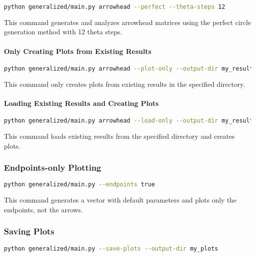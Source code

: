 \begin{lstlisting}[language=bash]
python generalized/main.py arrowhead --perfect --theta-steps 12
\end{lstlisting}

This command generates and analyzes arrowhead matrices using the perfect circle generation method with 12 theta steps.

\paragraph{Only Creating Plots from Existing Results}

\begin{lstlisting}[language=bash]
python generalized/main.py arrowhead --plot-only --output-dir my_results
\end{lstlisting}

This command only creates plots from existing results in the specified directory.

\paragraph{Loading Existing Results and Creating Plots}

\begin{lstlisting}[language=bash]
python generalized/main.py arrowhead --load-only --output-dir my_results
\end{lstlisting}

This command loads existing results from the specified directory and creates plots.

\subsubsection{Endpoints-only Plotting}

\begin{lstlisting}[language=bash]
python generalized/main.py --endpoints true
\end{lstlisting}

This command generates a vector with default parameters and plots only the endpoints, not the arrows.

\subsubsection{Saving Plots}

\begin{lstlisting}[language=bash]
python generalized/main.py --save-plots --output-dir my_plots
\end{lstlisting}

